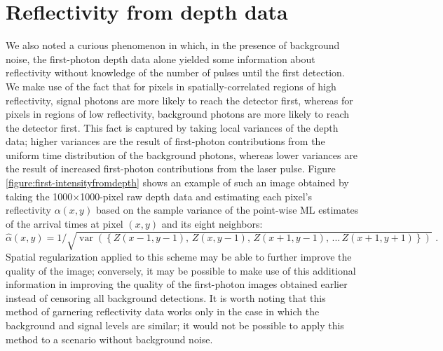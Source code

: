 \section{Reflectivity from depth data}
We also noted a curious phenomenon in which, in the presence of background noise, the first-photon depth data alone yielded some information about reflectivity without knowledge of the number of pulses until the first detection. We make use of the fact that for pixels in spatially-correlated regions of high reflectivity, signal photons are more likely to reach the detector first, whereas for pixels in regions of low reflectivity, background photons are more likely to reach the detector first. This fact is captured by taking local variances of the depth data; higher variances are the result of first-photon contributions from the uniform time distribution of the background photons, whereas lower variances are the result of increased first-photon contributions from the laser pulse. Figure \ref{figure:first-intensityfromdepth} shows an example of such an image obtained by taking the 1000$\times$1000-pixel raw depth data and estimating each pixel's reflectivity $\alpha(x,y)$ based on the sample variance of the point-wise ML estimates of the arrival times at pixel $(x,y)$ and its eight neighbors:
\begin{equation}
\hat{\alpha}(x,y) = 1 / \sqrt{\operatorname{var}\left(\left\{ Z(x-1, y-1),\,Z(x, y-1),\,Z(x+1,y-1),\,...\, Z(x+1,y+1)\right\}\right)}\,\,.
\end{equation}
Spatial regularization applied to this scheme may be able to further improve the quality of the image; conversely, it may be possible to make use of this additional information in improving the quality of the first-photon images obtained earlier instead of censoring all background detections. It is worth noting that this method of garnering reflectivity data works only in the case in which the background and signal levels are similar; it would not be possible to apply this method to a scenario without background noise.

